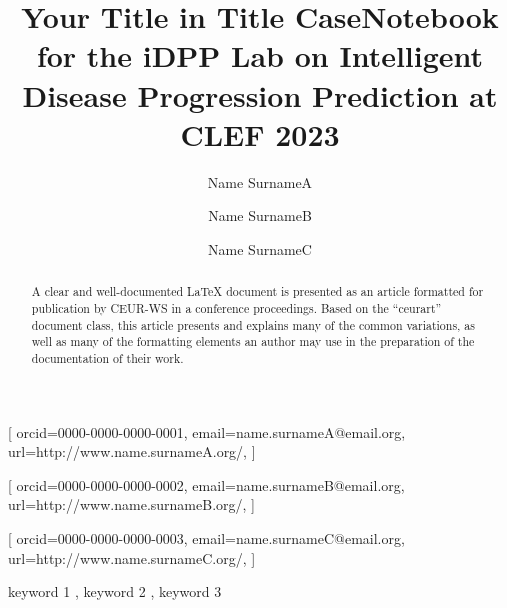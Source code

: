 \documentclass{ceurart}
\begin{document}


\title{Your Title in Title Case}

\title[mode=sub]{Notebook for the iDPP Lab on Intelligent Disease Progression Prediction at CLEF 2023}

\author[1]{Name SurnameA}[%
orcid=0000-0000-0000-0001,
email=name.surnameA@email.org,
url=http://www.name.surnameA.org/,
]

\author[1,2]{Name SurnameB}[%
orcid=0000-0000-0000-0002,
email=name.surnameB@email.org,
url=http://www.name.surnameB.org/,
]

\author[3]{Name SurnameC}[%
orcid=0000-0000-0000-0003,
email=name.surnameC@email.org,
url=http://www.name.surnameC.org/,
]

\address[1]{Organization 1, Somewhere}
\address[2]{Organization 2, Somewhere}
\address[3]{Organization, 3 Somewhere}


\begin{abstract}
  A clear and well-documented \LaTeX{} document is presented as an
  article formatted for publication by CEUR-WS in a conference
  proceedings. Based on the ``ceurart'' document class, this article
  presents and explains many of the common variations, as well as many
  of the formatting elements an author may use in the preparation of
  the documentation of their work.
\end{abstract}

\begin{keywords}
  keyword 1 \sep
  keyword 2 \sep
  keyword 3 
\end{keywords}

\maketitle
\end{document}
